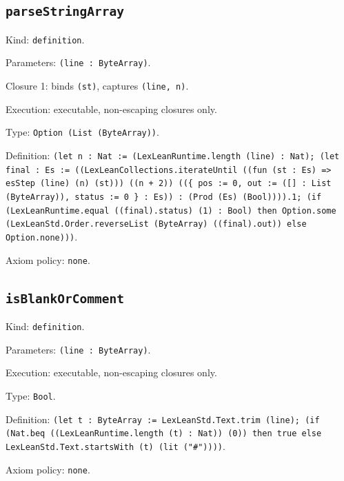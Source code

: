 \documentclass[11pt]{article}
\begin{document}
\subsection*{\texttt{parseStringArray}}
\noindent Kind: \texttt{definition}.\par
\noindent Parameters: \texttt{(line : ByteArray)}.\par
\noindent Closure 1: binds \texttt{(st)}, captures \texttt{(line, n)}.\par
\noindent Execution: executable, non-escaping closures only.\par
\noindent Type: \texttt{Option (List (ByteArray))}.\par
\noindent Definition: \texttt{(let n : Nat := (LexLeanRuntime.length (line) : Nat); (let final : Es := ((LexLeanCollections.iterateUntil ((fun (st : Es) => esStep (line) (n) (st))) ((n + 2)) ((\{ pos := 0, out := ([] : List (ByteArray)), status := 0 \} : Es)) : (Prod (Es) (Bool)))).1; (if (LexLeanRuntime.equal ((final).status) (1) : Bool) then Option.some (LexLeanStd.Order.reverseList (ByteArray) ((final).out)) else Option.none)))}.\par
\noindent Axiom policy: \texttt{none}.\par
\subsection*{\texttt{isBlankOrComment}}
\noindent Kind: \texttt{definition}.\par
\noindent Parameters: \texttt{(line : ByteArray)}.\par
\noindent Execution: executable, non-escaping closures only.\par
\noindent Type: \texttt{Bool}.\par
\noindent Definition: \texttt{(let t : ByteArray := LexLeanStd.Text.trim (line); (if (Nat.beq ((LexLeanRuntime.length (t) : Nat)) (0)) then true else LexLeanStd.Text.startsWith (t) (lit ("\#"))))}.\par
\noindent Axiom policy: \texttt{none}.\par
\end{document}
